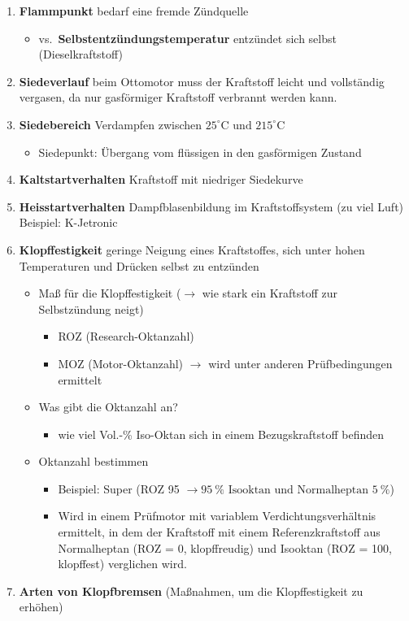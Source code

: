 \begin{enumerate}
\item
  \textbf{Flammpunkt} bedarf eine fremde Zündquelle

  \begin{itemize}
  \item
    vs.~\textbf{Selbstentzündungstemperatur} entzündet sich selbst
    (Dieselkraftstoff)
  \end{itemize}
\item
  \textbf{Siedeverlauf} beim Ottomotor muss der Kraftstoff leicht und
  vollständig vergasen, da nur gasförmiger Kraftstoff verbrannt werden
  kann.
\item
  \textbf{Siedebereich} Verdampfen zwischen
  $25^\circ\text{C} \text{ und } 215^\circ\text{C}$

  \begin{itemize}
  \item
    Siedepunkt: Übergang vom flüssigen in den gasförmigen Zustand
  \end{itemize}
\item
  \textbf{Kaltstartverhalten} Kraftstoff mit niedriger Siedekurve
\item
  \textbf{Heisstartverhalten} Dampfblasenbildung im Kraftstoffsystem (zu
  viel Luft) Beispiel: K-Jetronic
\item
  \textbf{Klopffestigkeit} geringe Neigung eines Kraftstoffes, sich
  unter hohen Temperaturen und Drücken selbst zu entzünden

  \begin{itemize}
  \item
    Maß für die Klopffestigkeit ($\to$ wie stark ein Kraftstoff zur
    Selbstzündung neigt)

    \begin{itemize}
    \item
      ROZ (Research-Oktanzahl)
    \item
      MOZ (Motor-Oktanzahl) $\to$ wird unter anderen Prüfbedingungen
      ermittelt
    \end{itemize}
  \item
    Was gibt die Oktanzahl an?

    \begin{itemize}
    \item
      wie viel Vol.-\% Iso-Oktan sich in einem Bezugskraftstoff befinden
    \end{itemize}
  \item
    Oktanzahl bestimmen

    \begin{itemize}
    \item
      Beispiel: Super (ROZ 95
      $\to 95~\% \text{ Isooktan und Normalheptan } 5~\%$)
    \item
      Wird in einem Prüfmotor mit variablem Verdichtungsverhältnis
      ermittelt, in dem der Kraftstoff mit einem Referenzkraftstoff aus
      Normalheptan (ROZ = 0, klopffreudig) und Isooktan (ROZ = 100,
      klopffest) verglichen wird.
    \end{itemize}
  \end{itemize}
\item
  \textbf{Arten von Klopfbremsen} (Maßnahmen, um die Klopffestigkeit zu
  erhöhen)


\end{enumerate}
